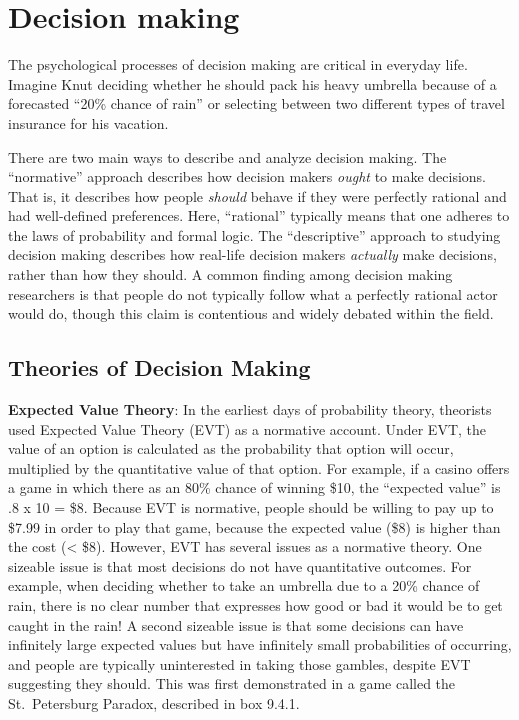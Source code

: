 \documentclass[
]{krantz}
\begin{document}
\section{Decision making}\label{decision-making}

The psychological processes of decision making are critical in everyday life. Imagine Knut deciding whether he should pack his heavy umbrella because of a forecasted ``20\% chance of rain'' or selecting between two different types of travel insurance for his vacation.

There are two main ways to describe and analyze decision making. The ``normative'' approach describes how decision makers \emph{ought} to make decisions. That is, it describes how people \emph{should} behave if they were perfectly rational and had well-defined preferences. Here, ``rational'' typically means that one adheres to the laws of probability and formal logic. The ``descriptive'' approach to studying decision making describes how real-life decision makers \emph{actually} make decisions, rather than how they should. A common finding among decision making researchers is that people do not typically follow what a perfectly rational actor would do, though this claim is contentious and widely debated within the field.

\subsection*{Theories of Decision Making}\label{theories-of-decision-making}


\textbf{Expected Value Theory}: In the earliest days of probability theory, theorists used Expected Value Theory (EVT) as a normative account. Under EVT, the value of an option is calculated as the probability that option will occur, multiplied by the quantitative value of that option. For example, if a casino offers a game in which there as an 80\% chance of winning \$10, the ``expected value'' is .8 x 10 = \$8. Because EVT is normative, people should be willing to pay up to \$7.99 in order to play that game, because the expected value (\$8) is higher than the cost (\textless{} \$8). However, EVT has several issues as a normative theory. One sizeable issue is that most decisions do not have quantitative outcomes. For example, when deciding whether to take an umbrella due to a 20\% chance of rain, there is no clear number that expresses how good or bad it would be to get caught in the rain! A second sizeable issue is that some decisions can have infinitely large expected values but have infinitely small probabilities of occurring, and people are typically uninterested in taking those gambles, despite EVT suggesting they should. This was first demonstrated in a game called the St.~Petersburg Paradox, described in box 9.4.1.
\end{document}
